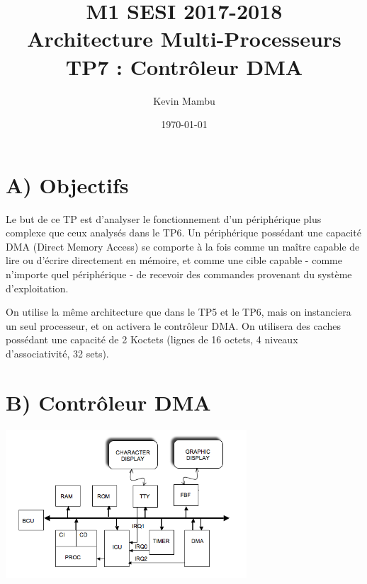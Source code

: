 \documentclass[10pt]{article}
\author{Kevin Mambu}
\date{\today}
\title{M1 SESI 2017-2018\\Architecture Multi-Processeurs\\TP7 : Contrôleur DMA}
\begin{document}
\maketitle

\section{A) Objectifs}
Le but de ce TP est d’analyser le fonctionnement d'un périphérique plus complexe
que ceux analysés dans le TP6. Un périphérique possédant une capacité DMA
(Direct Memory Access) se comporte à la fois comme un maître capable de lire ou
d'écrire directement en mémoire, et comme une cible capable - comme n'importe
quel périphérique - de recevoir des commandes provenant du système
d'exploitation.

On utilise la même architecture que dans le TP5 et le TP6, mais on instanciera
un seul processeur, et on activera le contrôleur DMA. On utilisera des caches
possédant une capacité de 2 Koctets (lignes de 16 octets, 4 niveaux
d'associativité, 32 sets).

\section{B) Contrôleur DMA}
\begin{center}
  \includegraphics[width=9cm]{tp7_topcell_dma.png}
\end{center}
\end{document}
